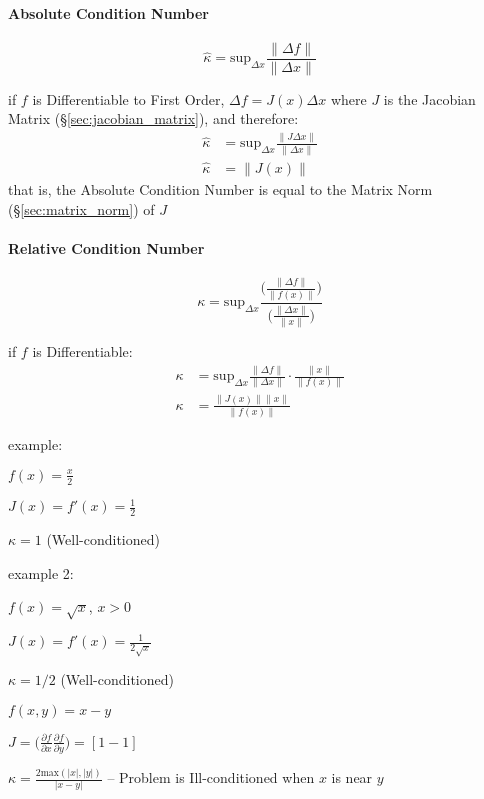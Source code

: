 \paragraph{Absolute Condition Number}\label{sec:absolute_condition_number}
\hfill

\[
  \hat{\kappa} = \mathrm{sup}_{\Delta x} \frac{\|\Delta f\|}{\|\Delta x\|}
\]

if $f$ is Differentiable to First Order, $\Delta f = J(x) \Delta x$ where $J$
is the Jacobian Matrix (\S\ref{sec:jacobian_matrix}), and therefore:
\begin{align*}
  \hat{\kappa} & = \mathrm{sup}_{\Delta x} \frac{\|J\Delta x\|}{\|\Delta x\|} \\
  \hat{\kappa} & = \|J(x)\|
\end{align*}
that is, the Absolute Condition Number is equal to the Matrix Norm
(\S\ref{sec:matrix_norm}) of $J$



\paragraph{Relative Condition Number}\label{sec:relative_condition_number}
\hfill

\[
  \kappa = \mathrm{sup}_{\Delta x} \frac{
    \Big(\frac{\|\Delta f\|}{\|f(x)\|}\Big)
  }{
    \Big(\frac{\|\Delta x\|}{\|x\|}\Big)
  }
\]

if $f$ is Differentiable:
\begin{align*}
  \kappa & = \mathrm{sup}_{\Delta x}
    \frac{\|\Delta f\|}{\|\Delta x\|} \cdot \frac{\|x\|}{\|f(x)\|} \\
  \kappa & = \frac{\|J(x)\| \|x\|}{\|f(x)\|}
\end{align*}

example:

$f(x) = \frac{x}{2}$

$J(x) = f'(x) = \frac{1}{2}$

$\kappa = 1$ (Well-conditioned)

example 2:

$f(x) = \sqrt x$, $x > 0$

$J(x) = f'(x) = \frac{1}{2\sqrt{x}}$

$\kappa = 1/2$ (Well-conditioned)

$f(x,y) = x - y$

$J = \Big(
  \frac{\partial{f}}{\partial{x}}
  \frac{\partial{f}}{\partial{y}}
\Big) = [1 -1]$

$\kappa = \frac{2 \mathrm{max}(|x|,|y|)}{|x - y|}$ --
Problem is Ill-conditioned when $x$ is near $y$


